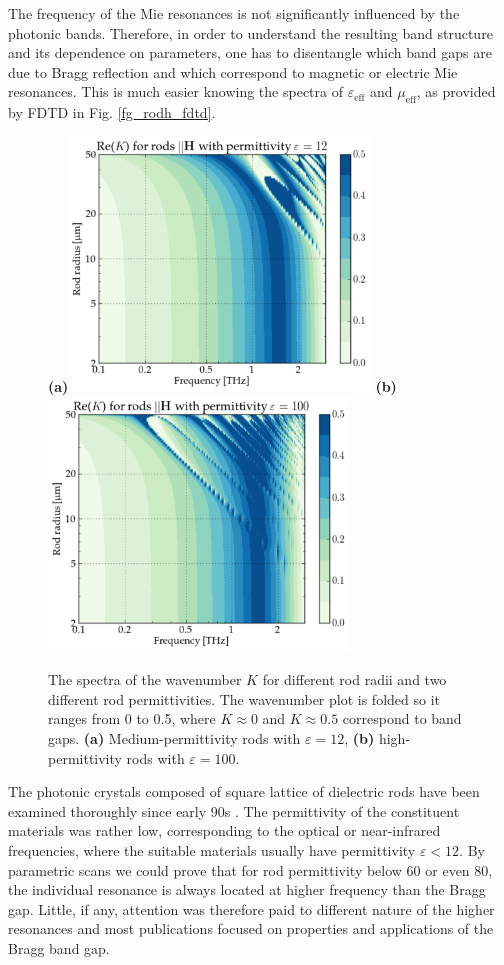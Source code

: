 {The frequency of the Mie resonances is not significantly influenced by the photonic bands. Therefore, in order to understand the resulting band structure and its dependence on parameters, one has to disentangle which band gaps are due to Bragg reflection and which correspond to magnetic or electric Mie resonances. This is much easier knowing the spectra of $\varepsilon_{\text{eff}}$ and $\mu_{\text{eff}}$, as provided by FDTD in Fig. \ref{fg_rodh_fdtd}.
\begin{figure}[ht] \caption{The spectra of the wavenumber $K$ for different rod radii and two different rod permittivities. The wavenumber plot is folded so it ranges from 0 to 0.5, where $K\approx 0$ and $K\approx 0.5$ correspond to band gaps. \textbf{(a)} Medium-permittivity rods with $\varepsilon = 12$, \textbf{(b)} high-permittivity rods with $\varepsilon = 100$.  } \label{fg_hbar_radiusscan} \centering 
\textbf{(a)}\includegraphics[width=8cm]{img/old/HRods_eps012_radiusscan.pdf}
\textbf{(b)}\includegraphics[width=8cm]{img/old/HRods_eps100_radiusscan.pdf}
\end{figure}

The photonic crystals composed of square lattice of dielectric rods have been examined thoroughly since early 90s \cite{plihal1991two, pendry1992_transfer_matrix}. The permittivity of the constituent materials was rather low, corresponding to the optical or near-infrared frequencies, where the suitable materials usually have permittivity $\varepsilon < 12$. By parametric scans we could prove that for rod permittivity below 60 or even 80, the individual resonance is always located at higher frequency than the Bragg gap. Little, if any, attention was therefore paid to different nature of the higher resonances and most publications focused on properties and applications of the Bragg band gap.

}
